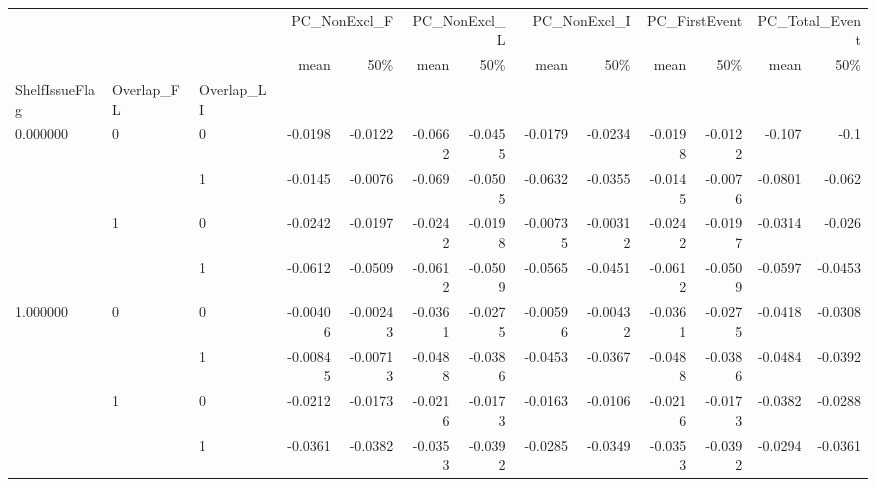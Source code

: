 \begin{tabular}{lllrrrrrrrrrr}
\toprule
 &  &  & \multicolumn{2}{r}{PC\_NonExcl\_F} & \multicolumn{2}{r}{PC\_NonExcl\_L} & \multicolumn{2}{r}{PC\_NonExcl\_I} & \multicolumn{2}{r}{PC\_FirstEvent} & \multicolumn{2}{r}{PC\_Total\_Event} \\
 &  &  & mean & 50\% & mean & 50\% & mean & 50\% & mean & 50\% & mean & 50\% \\
ShelfIssueFlag & Overlap_FL & Overlap_LI &  &  &  &  &  &  &  &  &  &  \\
\midrule
\multirow[t]{4}{*}{0.000000} & \multirow[t]{2}{*}{0} & 0 & -0.0198 & -0.0122 & -0.0662 & -0.0455 & -0.0179 & -0.0234 & -0.0198 & -0.0122 & -0.107 & -0.1 \\
 &  & 1 & -0.0145 & -0.0076 & -0.069 & -0.0505 & -0.0632 & -0.0355 & -0.0145 & -0.0076 & -0.0801 & -0.062 \\
\cline{2-13}
 & \multirow[t]{2}{*}{1} & 0 & -0.0242 & -0.0197 & -0.0242 & -0.0198 & -0.00735 & -0.00312 & -0.0242 & -0.0197 & -0.0314 & -0.026 \\
 &  & 1 & -0.0612 & -0.0509 & -0.0612 & -0.0509 & -0.0565 & -0.0451 & -0.0612 & -0.0509 & -0.0597 & -0.0453 \\
\cline{1-13} \cline{2-13}
\multirow[t]{4}{*}{1.000000} & \multirow[t]{2}{*}{0} & 0 & -0.00406 & -0.00243 & -0.0361 & -0.0275 & -0.00596 & -0.00432 & -0.0361 & -0.0275 & -0.0418 & -0.0308 \\
 &  & 1 & -0.00845 & -0.00713 & -0.0488 & -0.0386 & -0.0453 & -0.0367 & -0.0488 & -0.0386 & -0.0484 & -0.0392 \\
\cline{2-13}
 & \multirow[t]{2}{*}{1} & 0 & -0.0212 & -0.0173 & -0.0216 & -0.0173 & -0.0163 & -0.0106 & -0.0216 & -0.0173 & -0.0382 & -0.0288 \\
 &  & 1 & -0.0361 & -0.0382 & -0.0353 & -0.0392 & -0.0285 & -0.0349 & -0.0353 & -0.0392 & -0.0294 & -0.0361 \\
\cline{1-13} \cline{2-13}
\bottomrule
\end{tabular}
